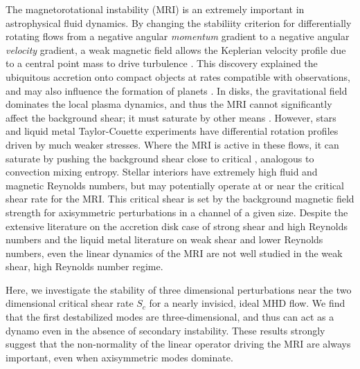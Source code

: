 \documentclass[aps,prl,reprint,superscriptaddress]{revtex4-1}
\begin{document}
The magnetorotational instability (MRI) is an extremely important in astrophysical fluid dynamics.
By changing the stabiliity criterion for differentially rotating flows from a negative angular \emph{momentum} gradient to a negative angular \emph{velocity} gradient, a weak magnetic field allows the Keplerian velocity profile due to a central point mass to drive turbulence \citep[e.g.][]{1998RvMP...70....1B}.
This discovery explained the ubiquitous accretion onto compact objects at rates compatible with observations, and may also influence the formation of planets \citep[e.g.][]{2007Natur.448.1022J}.
In disks, the gravitational field dominates the local plasma dynamics, and thus the MRI cannot significantly affect the background shear; it must saturate by other means \citep{2018MNRAS.474.3451X}.
However, stars and liquid metal Taylor-Couette experiments have differential rotation profiles driven by much weaker stresses.
Where the MRI is active in these flows, it can saturate by pushing the background shear close to critical \citep{2017ApJ...841....1C,2017ApJ...841....2C}, analogous to convection mixing entropy.
Stellar interiors have extremely high fluid and magnetic Reynolds numbers, but may potentially operate at or near the critical shear rate for the MRI.
This critical shear is set by the background magnetic field strength for axisymmetric perturbations in a channel of a given size.
Despite the extensive literature on the accretion disk case of strong shear and high Reynolds numbers and the liquid metal literature on weak shear and lower Reynolds numbers, even the linear dynamics of the MRI are not well studied in the weak shear, high Reynolds number regime.

Here, we investigate the stability of three dimensional perturbations near the two dimensional critical shear rate $S_c$ for a nearly invisicd, ideal MHD flow.
We find that the first destabilized modes are three-dimensional, and thus can act as a dynamo even in the absence of secondary instability.
These results strongly suggest that the non-normality of the linear operator driving the MRI are always important, even when axisymmetric modes dominate.
\end{document}
